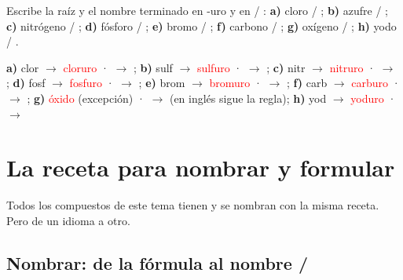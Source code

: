 \begin{exercise}
    Escribe la raíz y el nombre terminado en -uro y en  / : \textbf{a)} cloro / ; \textbf{b)} azufre / ; \textbf{c)} nitrógeno / ; \textbf{d)} fósforo / ; \textbf{e)} bromo / ; \textbf{f)} carbono / ; \textbf{g)} oxígeno / ; \textbf{h)} yodo / .
    \begin{solu}
        \textbf{a)} clor \(\to\) \textcolor{red}{cloruro} ·  \(\to\) \textcolor{red}{}; \textbf{b)} sulf \(\to\) \textcolor{red}{sulfuro} ·  \(\to\) \textcolor{red}{}; \textbf{c)} nitr \(\to\) \textcolor{red}{nitruro} ·  \(\to\) \textcolor{red}{}; \textbf{d)} fosf \(\to\) \textcolor{red}{fosfuro} ·  \(\to\) \textcolor{red}{}; \textbf{e)} brom \(\to\) \textcolor{red}{bromuro} ·  \(\to\) \textcolor{red}{}; \textbf{f)} carb \(\to\) \textcolor{red}{carburo} ·  \(\to\) \textcolor{red}{}; \textbf{g)} \textcolor{red}{óxido} (excepción) ·  \(\to\) \textcolor{red}{} (en inglés sigue la regla); \textbf{h)} yod \(\to\) \textcolor{red}{yoduro} ·  \(\to\) \textcolor{red}{}
    \end{solu}
\end{exercise}

\section{La receta para nombrar y formular}

Todos los compuestos de este tema tienen  y se nombran con la misma receta. Pero  de un idioma a otro.

\subsection{Nombrar: de la fórmula al nombre / }

